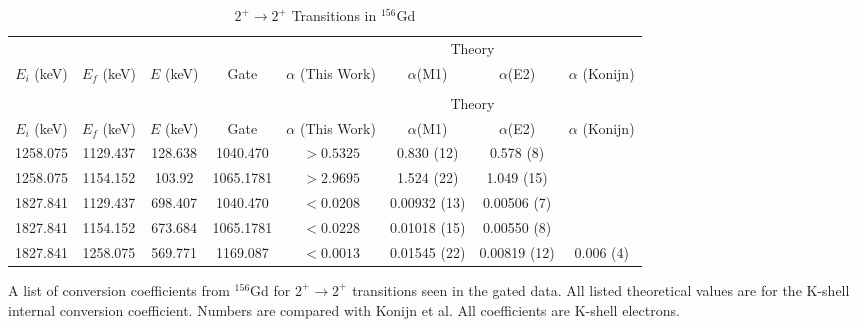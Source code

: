 \begin{landscape}
    \begin{longtable}{c|c|c|c|c|c|c|c}
        \caption{$2^+\rightarrow 2^+$ Transitions in $^{156}$Gd}
        \label{tab:156Gd_2_to_2}\\
        \toprule
        &	& 	&  &	& \multicolumn{2}{c}{Theory}	& 	\\
        $E_i$ (keV)	&	$E_f$ (keV)	& $E$ (keV)	&	Gate &		$\alpha$ (This Work)	& $\alpha$(M1) & $\alpha$(E2) &	$\alpha$ (Konijn)	\\
        \hline
        \endfirsthead
        \toprule
        \caption[]{$2^+\rightarrow 2^+$ Transitions in $^{156}$Gd}\\
        &	& 	&  &	& \multicolumn{2}{c}{Theory}	& 	\\
        $E_i$ (keV)	&	$E_f$ (keV)	& $E$ (keV)	&	Gate &		$\alpha$ (This Work)	& $\alpha$(M1) & $\alpha$(E2) &	$\alpha$ (Konijn)	\\
        \hline
	    \endhead
        1258.075 & 1129.437 & 128.638 & 1040.470 & $>0.5325$ & 0.830 (12) & 0.578 (8) &\\ \hline
        1258.075 & 1154.152 & 103.92 & 1065.1781 & $>2.9695$ & 1.524 (22)  & 1.049 (15) &\\ \hline
        1827.841 & 1129.437 & 698.407 & 1040.470 & $<0.0208$ & 0.00932 (13) & 0.00506 (7) & \\ \hline
        1827.841 & 1154.152 & 673.684 & 1065.1781 & $<0.0228$ & 0.01018 (15) & 0.00550 (8) &\\ \hline
        1827.841 & 1258.075 & 569.771 & 1169.087 & $<0.0013$ & 0.01545 (22) & 0.00819 (12) & 0.006 (4) \\
        \bottomrule
    \end{longtable}
    \caption{A list of conversion coefficients from $^{156}$Gd for $2^+\rightarrow 2^+$ transitions seen in the gated data. All listed theoretical values are for the K-shell internal conversion coefficient. Numbers are compared with Konijn et al.\citep{konjin81:_156gd} All coefficients are K-shell electrons.}
\end{landscape}